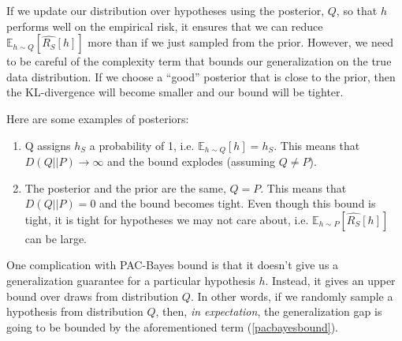 \documentclass{article}
\begin{document}
If we update our distribution over hypotheses using the posterior, $Q$, so that $h$ performs well on the empirical risk, it ensures that we can reduce $\mathbb{E}_{h\sim Q}[\hat{R_S}[h]]$ more than if we just sampled from the prior. However, we need to be careful of the complexity term that bounds our generalization on the true data distribution. If we choose a ``good'' posterior that is close to the prior, then the KL-divergence will become smaller and our bound will be tighter. 

Here are some examples of posteriors:
\begin{enumerate}
    \item Q assigns $h_S$ a probability of 1, i.e. $\mathbb{E}_{h\sim Q}[h] = h_S$. This means that $D(Q||P)\rightarrow \infty$ and the bound explodes (assuming $Q \neq P$).
    \item The posterior and the prior are the same, $Q=P$. This means that $D(Q||P)=0$ and the bound becomes tight. Even though this bound is tight, it is tight for hypotheses we may not care about, i.e. $\mathbb{E}_{h\sim P}[\hat{R_S}[h]]$ can be large.
\end{enumerate}

One complication with PAC-Bayes bound is that it doesn't give us a generalization guarantee for a particular hypothesis $h$. Instead, it gives an upper bound over draws from distribution $Q$. In other words, if we randomly sample a hypothesis from distribution $Q$, then, \emph{in expectation}, the generalization gap is going to be bounded by the aforementioned term (\ref{pacbayesbound}).

\vspace{0.5cm}


\end{document}
